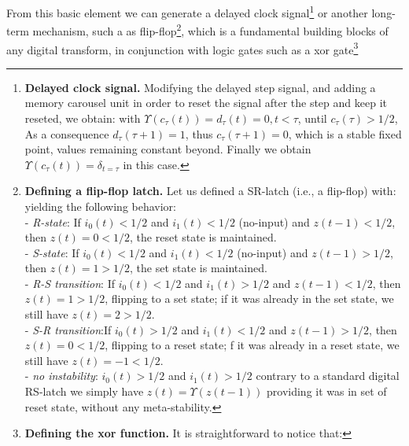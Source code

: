 From this basic element we can generate a delayed clock signal\footnote{{\bf Delayed clock signal.} Modifying the delayed step signal, and adding a memory carousel unit in order to reset the signal after the step and keep it reseted, we obtain: 
with $\Upsilon(c_\tau(t)) = d_\tau(t) = 0, t < \tau$, until $c_\tau(\tau) > 1/2$, As a consequence $d_\tau(\tau + 1) = 1$, thus $c_\tau(\tau + 1) = 0$, which is a stable fixed point, values remaining constant beyond. Finally we obtain $\Upsilon(c_\tau(t)) = \delta_{t=\tau}$ in this case.
\hr} or another long-term mechanism, such a as flip-flop\footnote{{\bf Defining a flip-flop latch.} Let us defined a SR-latch (i.e., a flip-flop) with:
yielding the following behavior:
\\- {\em R-state}: If $i_0(t) < 1/2$ and $i_1(t) < 1/2$ (no-input) and $z(t-1) < 1/2$, then $z(t) = 0 < 1/2$, the reset state is maintained.
\\- {\em S-state}: If $i_0(t) < 1/2$ and $i_1(t) < 1/2$ (no-input) and $z(t-1) > 1/2$, then $z(t) = 1 > 1/2$, the set state is maintained.
\\- {\em R-S transition}: If $i_0(t) < 1/2$ and $i_1(t) > 1/2$  and $z(t-1) < 1/2$, then $z(t) = 1 > 1/2$, flipping to a set state; if it was already in the set state, we still have $z(t) = 2 > 1/2$.
\\- {\em S-R transition}:If $i_0(t) > 1/2$ and $i_1(t) < 1/2$  and $z(t-1) > 1/2$, then $z(t) = 0 < 1/2$, flipping to a reset state; f it was already in a reset state, we still have $z(t) = - 1 < 1/2$.
\\- {\em no instability}: $i_0(t) > 1/2$ and $i_1(t) > 1/2$ contrary to a standard digital RS-latch we simply have $z(t) = \Upsilon(z(t-1))$ providing it was in set of reset state, without any meta-stability.
\hr}, which is a fundamental building blocks of any digital transform, in conjunction with logic gates such as a xor gate\footnote{{\bf Defining the xor function.} It is straightforward to notice that: 
}
